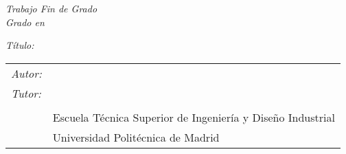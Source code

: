 \begin{titlepage}
  \vspace*{4cm}
  \noindent
  \textit{Trabajo Fin de Grado}\\
  \textit{Grado en} \Grado{}
  
  \textit{Título:} \TituloTFG{}

  \Fecha

  \vspace*{3cm}

  \noindent
  \begin{tabular}{ll}
     \textit{Autor:} & \NombreAutor{}  \\
     \textit{Tutor:} & \NombreTutor{}  \\
     & \Departamento{} \\
     & Escuela Técnica Superior de Ingeniería y Diseño Industrial \\
     & Universidad Politécnica de Madrid
  \end{tabular}

\end{titlepage}
